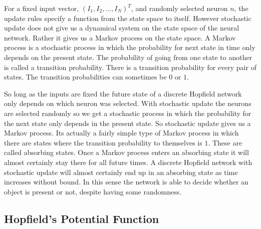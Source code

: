
   For a fixed input vector, $(I_1, I_2, \ldots, I_N)^T$, and randomly selected
neuron $n$, the update rules specify a function from the state space to itself.
However stochastic update does not give us a dynamical system on the state 
space of the neural network.  Rather it gives us a Markov process on the state 
space.  A Markov process is a stochastic process in which the probability for
next state in time only depends on the present state.  The probability of 
going from one state to another is called a transition probability.  There is
a transition probability for every pair of states.  The transition 
probabilities can sometimes be $0$ or $1$.

   So long as the inputs are fixed the future state of a discrete Hopfield 
network only depends on which neuron was selected.  With stochastic update 
the neurons are selected randomly so we get a stochastic process in which the
probability for the next state only depends in the present state.  So 
stochastic update gives us a Markov process.  Its actually a fairly simple
type of Markov process in which there are states where the transition
probability to themselves is $1$.  These are called absorbing states.  Once a
Markov process enters an absorbing state it will almost certainly stay there
for all future times.  A discrete Hopfield network with stochastic update will 
almost certainly end up in an absorbing state as time increases without bound.
In this sense the network is able to decide whether an object is present or 
not, despite having some randomness.

\subsection{Hopfield's Potential Function}

